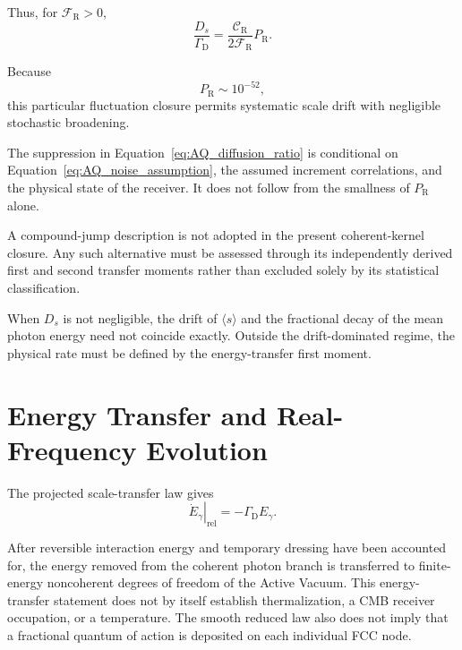 Thus, for $\mathcal F_{\mathrm R}>0$,
\begin{equation}
    \boxed{
    \frac{
        D_s
    }{
        \Gamma_{\mathrm D}
    }
    =
    \frac{
        \mathcal C_{\mathrm R}
    }{
        2\mathcal F_{\mathrm R}
    }
    P_{\mathrm R}.
    }
    \label{eq:AQ_diffusion_ratio}
\end{equation}

Because
\begin{equation}
    P_{\mathrm R}
    \sim
    10^{-52},
\end{equation}
this particular fluctuation closure permits systematic scale drift with
negligible stochastic broadening.

The suppression in Equation~\eqref{eq:AQ_diffusion_ratio} is conditional on
Equation~\eqref{eq:AQ_noise_assumption}, the assumed increment correlations,
and the physical state of the receiver. It does not follow from the smallness
of $P_{\mathrm R}$ alone.

A compound-jump description is not adopted in the present coherent-kernel
closure. Any such alternative must be assessed through its independently
derived first and second transfer moments rather than excluded solely by its
statistical classification.

When $D_s$ is not negligible, the drift of $\langle s\rangle$ and the
fractional decay of the mean photon energy need not coincide exactly. Outside
the drift-dominated regime, the physical rate must be defined by the
energy-transfer first moment.


\section{Energy Transfer and Real-Frequency Evolution}

The projected scale-transfer law gives
\begin{equation}
    \boxed{
    \left.\dot E_{\gamma}\right|_{\mathrm{rel}}
    =
    -\Gamma_{\mathrm D}E_{\gamma}.
    }
    \label{eq:AQ_energy_decay}
\end{equation}

After reversible interaction energy and temporary dressing have been accounted
for, the energy removed from the coherent photon branch is transferred to
finite-energy noncoherent degrees of freedom of the Active Vacuum. This
energy-transfer statement does not by itself establish thermalization, a CMB
receiver occupation, or a temperature. The smooth reduced law also does not
imply that a fractional quantum of action is deposited on each individual FCC
node.

